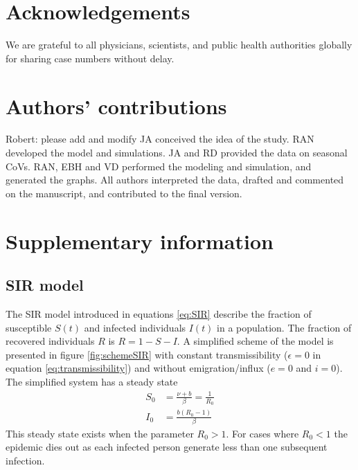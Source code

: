 \documentclass[rmp, reprint, superscriptaddress, floatfix,amsmath]{revtex4-1}
\newcommand{\Robert}[1]{{\color{celestialblue}Robert: #1}}
\begin{document}
\section*{Acknowledgements}
We are grateful to all physicians, scientists, and public health authorities globally for sharing case numbers without delay.

\section*{Authors' contributions} \Robert{please add and modify}
JA conceived the idea of the study. RAN developed the model and simulations. JA and RD provided the data on seasonal CoVs. RAN, EBH and VD performed the modeling and simulation, and generated the graphs. All authors interpreted the data, drafted and commented on the manuscript, and contributed to the final version. 



\newpage

\appendix
\setcounter{figure}{0}
\renewcommand{\figurename}{Figure S}
\setcounter{table}{0}
\renewcommand{\tablename}{Table S}

\section*{Supplementary information}

\subsection{SIR model}

The SIR model introduced in equations \ref{eq:SIR} describe the fraction of susceptible $S(t)$ and infected individuals $I(t)$ in a population. 
The fraction of recovered individuals $R$ is $R=1 - S - I$. 
A simplified scheme of the model is presented in figure \ref{fig:schemeSIR} with constant transmissibility ($\epsilon=0$ in equation \ref{eq:transmissibility}) and without emigration/influx ($e=0$ and $i=0$).
The simplified system has a steady state
\begin{equation}
\begin{split}
S_0 &= \frac{\nu + b}{\beta} = \frac{1}{R_0} \\
I_0 & = \frac{b(R_0-1)}{\beta}
\end{split}
\label{eq:fixed_point}
\end{equation}
This steady state exists when the parameter $R_0 > 1$. For cases where $R_0 < 1$ the epidemic dies out as each infected person generate less than one subsequent infection. 
\end{document}
